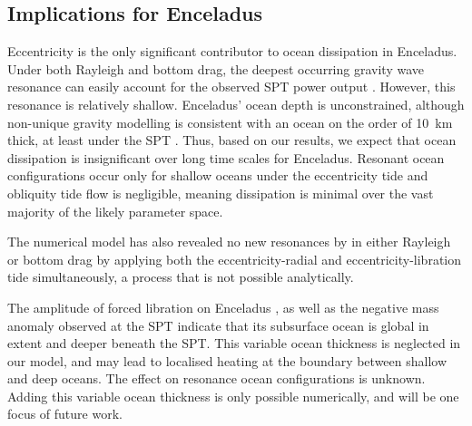 \subsection{Implications for Enceladus}

Eccentricity is the only significant contributor to ocean dissipation in Enceladus. Under both Rayleigh and bottom drag, the deepest occurring gravity wave resonance can easily account for the observed SPT power output \citep{spencer2006cassini}. However, this resonance is relatively shallow. Enceladus' ocean depth is unconstrained, although non-unique gravity modelling is consistent with an ocean on the order of \SI{10}{\kilo\metre} thick, at least under the SPT \citep{iess2014gravity}. Thus, based on our results, we expect that ocean dissipation is insignificant over long time scales for Enceladus. Resonant ocean configurations occur only for shallow oceans under the eccentricity tide and obliquity tide flow is negligible, meaning dissipation is minimal over the vast majority of the likely parameter space.

The numerical model has also revealed no new resonances by in either Rayleigh or bottom drag by applying both the eccentricity-radial and eccentricity-libration tide simultaneously, a process that is not possible analytically.

The amplitude of forced libration on Enceladus \citep{thomas2015enceladus}, as well as the negative mass anomaly observed at the SPT \citep{iess2014gravity, mckinnon2015effect} indicate that its subsurface ocean is global in extent and deeper beneath the SPT. This variable ocean thickness is neglected in our model, and may lead to localised heating at the boundary between shallow and deep oceans. The effect on resonance ocean configurations is unknown. Adding this variable ocean thickness is only possible numerically, and will be one focus of future work.


